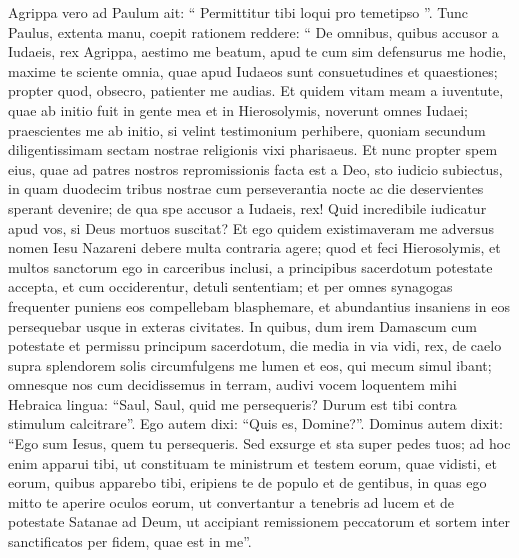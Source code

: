 \begin{biblechapter}
\begin{biblechapter}
\begin{biblechapter}
\begin{biblechapter}
\begin{biblechapter}
\begin{biblechapter}
\begin{biblechapter}
\begin{biblechapter}
\begin{biblechapter}
\begin{biblechapter}
\begin{biblechapter}
\begin{biblechapter}
\begin{biblechapter}
\begin{biblechapter}
\begin{biblechapter}
\begin{biblechapter}
\begin{biblechapter}
\begin{biblechapter}
\begin{biblechapter}
\begin{biblechapter}
\begin{biblechapter}
\begin{biblechapter}
\begin{biblechapter}
\begin{biblechapter}
\begin{biblechapter}
\begin{biblechapter}
\verse Agrippa vero ad Paulum ait: “ Permittitur tibi loqui pro temetipso ”. Tunc Paulus, extenta manu, coepit rationem reddere: 
\verse “ De omnibus, quibus accusor a Iudaeis, rex Agrippa, aestimo me beatum, apud te cum sim defensurus me hodie, 
\verse maxime te sciente omnia, quae apud Iudaeos sunt consuetudines et quaestiones; propter quod, obsecro, patienter me audias. 
\verse Et quidem vitam meam a iuventute, quae ab initio fuit in gente mea et in Hierosolymis, noverunt omnes Iudaei; 
\verse praescientes me ab initio, si velint testimonium perhibere, quoniam secundum diligentissimam sectam nostrae religionis vixi pharisaeus. 
 \verse Et nunc propter spem eius, quae ad patres nostros repromissionis facta est a Deo, sto iudicio subiectus, 
\verse in quam duodecim tribus nostrae cum perseverantia nocte ac die deservientes sperant devenire; de qua spe accusor a Iudaeis, rex! 
\verse Quid incredibile iudicatur apud vos, si Deus mortuos suscitat?
 \verse Et ego quidem existimaveram me adversus nomen Iesu Nazareni debere multa contraria agere; 
\verse quod et feci Hierosolymis, et multos sanctorum ego in carceribus inclusi, a principibus sacerdotum potestate accepta, et cum occiderentur, detuli sententiam; 
\verse et per omnes synagogas frequenter puniens eos compellebam blasphemare, et abundantius insaniens in eos persequebar usque in exteras civitates.
 \verse In quibus, dum irem Damascum cum potestate et permissu principum sacerdotum, 
\verse die media in via vidi, rex, de caelo supra splendorem solis circumfulgens me lumen et eos, qui mecum simul ibant; 
\verse omnesque nos cum decidissemus in terram, audivi vocem loquentem mihi Hebraica lingua: “Saul, Saul, quid me persequeris? Durum est tibi contra stimulum calcitrare”. 
\verse Ego autem dixi: “Quis es, Domine?”. Dominus autem dixit: “Ego sum Iesus, quem tu persequeris. 
 \verse Sed exsurge et sta super pedes tuos; ad hoc enim apparui tibi, ut constituam te ministrum et testem eorum, quae vidisti, et eorum, quibus apparebo tibi, 
 \verse eripiens te de populo et de gentibus, in quas ego mitto te 
\verse aperire oculos eorum, ut convertantur a tenebris ad lucem et de potestate Satanae ad Deum, ut accipiant remissionem peccatorum et sortem inter sanctificatos per fidem, quae est in me”.

\end{biblechapter}
\end{biblechapter}
\end{biblechapter}
\end{biblechapter}
\end{biblechapter}
\end{biblechapter}
\end{biblechapter}
\end{biblechapter}
\end{biblechapter}
\end{biblechapter}
\end{biblechapter}
\end{biblechapter}
\end{biblechapter}
\end{biblechapter}
\end{biblechapter}
\end{biblechapter}
\end{biblechapter}
\end{biblechapter}
\end{biblechapter}
\end{biblechapter}
\end{biblechapter}
\end{biblechapter}
\end{biblechapter}
\end{biblechapter}
\end{biblechapter}
\end{biblechapter}
